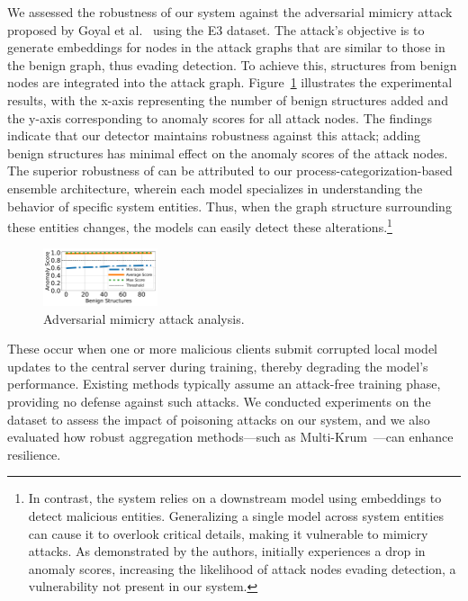 
 We assessed the robustness of our system against the adversarial mimicry attack proposed by Goyal et al.~\cite{goyal2023sometimes} using the E3 dataset. The attack's objective is to generate embeddings for nodes in the attack graphs that are similar to those in the benign graph, thus evading detection. To achieve this, structures from benign nodes are integrated into the attack graph. Figure~\ref{mimicryattack} illustrates the experimental results, with the x-axis representing the number of benign structures added and the y-axis corresponding to anomaly scores for all attack nodes. The findings indicate that our detector maintains robustness against this attack; adding benign structures has minimal effect on the anomaly scores of the attack nodes. The superior robustness of \Sys can be attributed to our process-categorization-based ensemble \gnnshort architecture, wherein each model specializes in understanding the behavior of specific system entities. Thus, when the graph structure surrounding these entities changes, the models can easily detect these alterations.\footnote{In contrast, the \flash system relies on a downstream model using \gnnshort embeddings to detect malicious entities. Generalizing a single model across system entities can cause it to overlook critical details, making it vulnerable to mimicry attacks. As demonstrated by the authors, \flash initially experiences a drop in anomaly scores, increasing the likelihood of attack nodes evading detection, a vulnerability not present in our system.}

\begin{figure}[!t]
    \centering
    \includegraphics[width=0.3\textwidth]{fig/adversarial.pdf}
    \caption{Adversarial mimicry attack analysis.}
    \label{mimicryattack}
    \vspace{-2ex}
  \end{figure}


 These occur when one or more malicious clients submit corrupted local model updates to the central server during training, thereby degrading the model’s performance. Existing methods typically assume an attack-free training phase, providing no defense against such attacks. We conducted experiments on the \optc dataset to assess the impact of poisoning attacks on our system, and we also evaluated how robust aggregation methods—such as Multi-Krum~\cite{munoz2019byzantine}—can enhance resilience.

